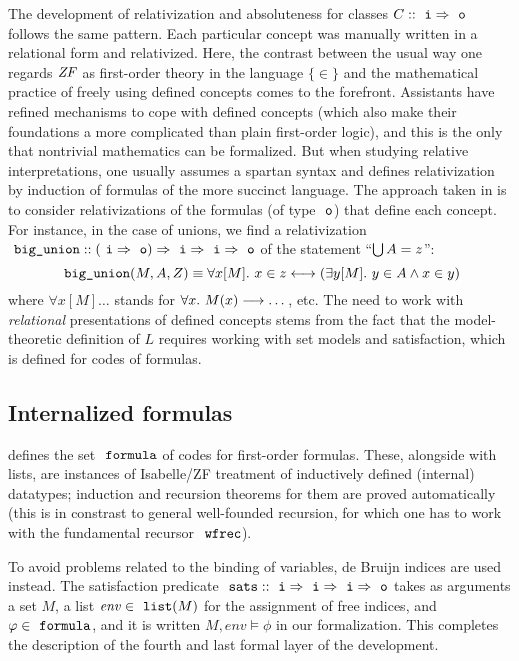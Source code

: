 The development of relativization and absoluteness for classes $C::
\isatt{i} \fun \isatt{o}$ follows the same pattern. Each particular
concept was manually written in a relational form and relativized.
Here, the contrast between the usual way one regards $\mathit{ZF}$ as
first-order theory in the language $\{\in \}$ and the mathematical
practice of freely using defined concepts comes to the
forefront. Assistants have refined mechanisms to cope with defined
concepts (which also make their foundations a more complicated
than plain first-order logic), and this is the only that  nontrivial
mathematics can be formalized. But when studying relative interpretations, one
usually assumes a spartan syntax and defines relativization by
induction of formulas of the more succinct language. The approach
taken in  is to consider relativizations of
the formulas (of type $\tyo$) that define each concept. For instance,
in the case of unions, we find a relativization
$\isatt{big{\uscore}union}:: (\isatt{i} \fun \isatt{o}) \fun \isatt{i}
\fun \isatt{i} \fun \isatt{o}$ of the statement
“$\mathop{\textstyle\bigcup} A = z$”:
\[
 \isatt{big{\uscore}union}(M,A,Z) \equiv \forall x[M].\ x \in z
 \longleftrightarrow (\exists y[M].\ y \in A \land x \in y)
\]
where $\forall x[M]\dots$ stands for $\forall x.\ M(x)\longrightarrow \dots$,
etc. The need to work with \emph{relational} presentations of defined
concepts stems from the fact that the model-theoretic definition of
$L$ requires working with set models and satisfaction, which is
defined for codes of formulas.

\subsection{Internalized formulas}
\label{sec:internalized-formulas}

 defines the set $\formula$ of codes for
first-order formulas. These, alongside with lists, are instances of
Isabelle/ZF treatment of inductively defined (internal) datatypes; induction
and recursion theorems for them are proved automatically (this is in
constrast to general well-founded recursion, for which one has to work
with the fundamental recursor $\isatt{wfrec}$).

To avoid problems related to the binding of variables, de Bruijn
indices \cite{MR0321704} are used instead. The satisfaction predicate
$\isatt{sats}::\tyi\fun\tyi\fun\tyi\fun\tyo$ takes as arguments a set $M$, a list
$\mathit{env}\in\isatt{list}(M)$ for the assignment of free indices,
and $\phi\in\formula$, and it is written
$M,\mathit{env}\models\phi$ in our formalization. This completes the
description of the fourth and last formal layer of the development.

